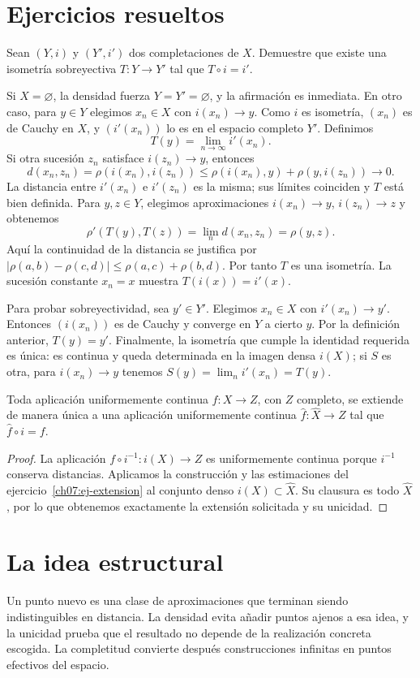 \section{Ejercicios resueltos}
\begin{ejercicio}\label{ch09:unicidad}
Sean $(Y,i)$ y $(Y',i')$ dos completaciones de $X$. Demuestre que existe una isometría sobreyectiva $T:Y\to Y'$ tal que $T\circ i=i'$.
\end{ejercicio}
\begin{solucion}
Si $X=\varnothing$, la densidad fuerza $Y=Y'=\varnothing$, y la afirmación es inmediata. En otro caso, para $y\in Y$ elegimos $x_n\in X$ con $i(x_n)\to y$. Como $i$ es isometría, $(x_n)$ es de Cauchy en $X$, y $(i'(x_n))$ lo es en el espacio completo $Y'$. Definimos
\[
 T(y)=\lim_{n\to\infty}i'(x_n).
\]
Si otra sucesión $z_n$ satisface $i(z_n)\to y$, entonces
\[
 d(x_n,z_n)=\rho(i(x_n),i(z_n))
 \leq\rho(i(x_n),y)+\rho(y,i(z_n))\longrightarrow0.
\]
La distancia entre $i'(x_n)$ e $i'(z_n)$ es la misma; sus límites coinciden y $T$ está bien definida. Para $y,z\in Y$, elegimos aproximaciones $i(x_n)\to y$, $i(z_n)\to z$ y obtenemos
\[
 \rho'(T(y),T(z))=\lim_nd(x_n,z_n)=\rho(y,z).
\]
Aquí la continuidad de la distancia se justifica por $|\rho(a,b)-\rho(c,d)|\leq\rho(a,c)+\rho(b,d)$. Por tanto $T$ es una isometría. La sucesión constante $x_n=x$ muestra $T(i(x))=i'(x)$.

Para probar sobreyectividad, sea $y'\in Y'$. Elegimos $x_n\in X$ con $i'(x_n)\to y'$. Entonces $(i(x_n))$ es de Cauchy y converge en $Y$ a cierto $y$. Por la definición anterior, $T(y)=y'$. Finalmente, la isometría que cumple la identidad requerida es única: es continua y queda determinada en la imagen densa $i(X)$; si $S$ es otra, para $i(x_n)\to y$ tenemos $S(y)=\lim_ni'(x_n)=T(y)$.
\end{solucion}

\begin{corolario}\label{ch09:extension}
Toda aplicación uniformemente continua $f:X\to Z$, con $Z$ completo, se extiende de manera única a una aplicación uniformemente continua $\widehat f:\widehat X\to Z$ tal que $\widehat f\circ i=f$.
\end{corolario}
\begin{proof}
La aplicación $f\circ i^{-1}:i(X)\to Z$ es uniformemente continua porque $i^{-1}$ conserva distancias. Aplicamos la construcción y las estimaciones del ejercicio~\ref{ch07:ej-extension} al conjunto denso $i(X)\subset\widehat X$. Su clausura es todo $\widehat X$, por lo que obtenemos exactamente la extensión solicitada y su unicidad.
\end{proof}

\section{La idea estructural}
Un punto nuevo es una clase de aproximaciones que terminan siendo indistinguibles en distancia. La densidad evita añadir puntos ajenos a esa idea, y la unicidad prueba que el resultado no depende de la realización concreta escogida. La completitud convierte después construcciones infinitas en puntos efectivos del espacio.
